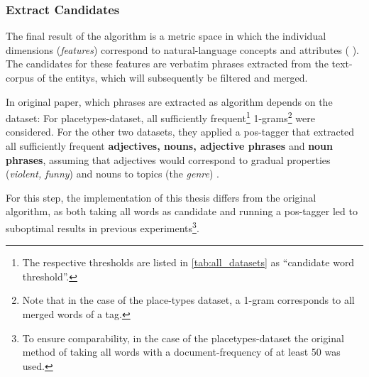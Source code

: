 \subsubsection{Extract Candidates}
\label{sec:extract_cands}

The final result of the algorithm is a metric space in which the individual dimensions (\emph{\glspl{feature}}) correspond to natural-language concepts and attributes ( \cite{Derrac2015}). The candidates for these features are verbatim phrases extracted from the text-corpus of the \glspl{entity}, which will subsequently be filtered and merged.

In  original paper, which phrases are extracted as algorithm depends on the dataset: For placetypes-dataset, all sufficiently frequent\footnote{\label{fnote:cand_thresholds}The respective thresholds are listed in \autoref{tab:all_datasets} as ``candidate word threshold''.} 1-grams\footnote{Note that in the case of the place-types dataset, a 1-gram corresponds to all merged words of a tag.} were considered. For the other two datasets, they applied a \gls{pos}-tagger that extracted all sufficiently frequent \textbf{adjectives, nouns, adjective phrases} and \textbf{noun phrases}, assuming that adjectives would correspond to gradual properties (\eg \textit{violent, funny}) and nouns to topics (\eg the \textit{genre}) \cite[Sec. 4.2.1]{Derrac2015}.

For this step, the implementation of this thesis differs from the original algorithm, as both taking all words as candidate and running a \gls{pos}-tagger led to suboptimal results in previous experiments\footnote{To ensure comparability, in the case of the placetypes-dataset the original method of taking all words with a document-frequency of at least 50 was used.}. 

